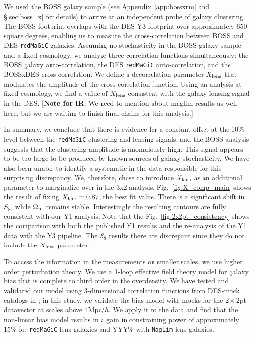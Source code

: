 \documentclass[fleqn,usenatbib]{mnras}
\newcommand{\redmagic}{\texttt{redMaGiC} }
\newcommand{\maglim}{\texttt{MagLim} }
\newcommand{\IR}[1]{{\color{red}[\textbf{Note for IR}: #1]}}
\begin{document}
We used the BOSS galaxy sample (see Appendix~\ref{app:bossxrm} and \S\ref{sec:boss_x} for details) to arrive at an independent probe of galaxy clustering. The BOSS footprint overlaps with the DES Y3 footprint over approximately 650 square degrees,
enabling us to measure the cross-correlation between BOSS and DES \redmagic galaxies.  Assuming no stochasticity in the BOSS galaxy sample and a fixed cosmology, we analyze three correlation functions simultaneously: the BOSS galaxy auto-correlation, the DES \redmagic auto-correlation, and the BOSSxDES cross-correlation.  We define a decorrelation parameter $X_{\rm lens}$ that modulates the amplitude of the cross-correlation function.  Using an analysis at fixed cosmology, we find a value of $X_{\rm lens}$ consistent with the galaxy-lensing signal in the DES.    
\IR{We need to mention about maglim results as well here, but we are waiting to finish final chains for this analysis.}

In summary, we conclude that there is evidence for a constant offset at the 10\% level between the \redmagic clustering and lensing signals, and the BOSS analysis suggests that the clustering amplitude is anomalously high. This signal appears to be too large to be produced by known sources of galaxy stochasticity. We have also been unable to identify a systematic in the data responsible for this surprising discrepancy. We, therefore, chose to introduce $X_{\rm lens}$ as an additional parameter to marginalize over in the 3x2 analysis. Fig.~\ref{fig:X_comp_main} shows the result of fixing $X_{\rm lens}=0.87$, the best fit value. There is a significant shift in $S_8$, while $\Omega_{\rm m}$ remains stable. Interestingly the resulting contours are fully consistent with our Y1 analysis.  Note that the Fig.~\ref{fig:2x2pt_consistency} shows the comparison with both the published Y1 results and the re-analysis of the Y1 data with the Y3 pipeline. The $S_8$ results there are discrepant since they do not include the $X_{\rm lens}$ parameter. 

To access the information in the measurements on smaller scales, we use higher order perturbation theory. We use a 1-loop effective field theory model for galaxy bias that is complete to third order in the overdensity. We have tested and validated our model using 3-dimensional correlation functions from DES-mock catalogs in \citet{p2020perturbation}; in this study, we validate the bias model with mocks for the $2\times2$pt datavector at scales above 4Mpc/$h$. We apply it to the data and find that the non-linear bias model results in a gain in constraining power of approximately 15\% for \redmagic lens galaxies and YYY\% with \maglim lens galaxies. 
\end{document}
